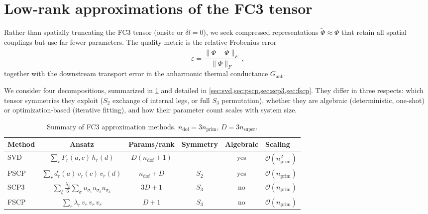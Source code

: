 \documentclass[11pt]{article}
\newcommand{\ndof}{n_{\mathrm{dof}}}
\newcommand{\nprim}{n_{\mathrm{prim}}}
\newcommand{\nsuper}{n_{\mathrm{super}}}
\newcommand{\cO}{\mathcal{O}}
\begin{document}
%
%

\section{Low-rank approximations of the FC3 tensor}
\label{sec:lowrank}

Rather than spatially truncating the FC3 tensor (onsite or
$\delta l = 0$), we seek compressed representations
$\tilde{\Phi} \approx \Phi$ that retain all spatial couplings but use
far fewer parameters.  The quality metric is the relative Frobenius
error
\begin{equation}\label{eq:error}
  \varepsilon = \frac{\|\Phi - \tilde\Phi\|_F}{\|\Phi\|_F}\,,
\end{equation}
together with the downstream transport error in the anharmonic thermal
conductance $G_\mathrm{anh}$.

We consider four decompositions, summarized in \cref{tab:methods} and
detailed in \cref{sec:svd,sec:pscp,sec:scp3,sec:fscp}.  They differ in
three respects: which tensor symmetries they exploit ($S_2$ exchange of
internal legs, or full $S_3$ permutation), whether they are algebraic
(deterministic, one-shot) or optimization-based (iterative fitting),
and how their parameter count scales with system size.

\begin{table}[ht]
\centering
\caption{Summary of FC3 approximation methods.
$\ndof = 3\nprim$, $D = 3\nsuper$.}
\label{tab:methods}
\begin{tabular}{@{}lccccl@{}}
\toprule
\textbf{Method}
  & \textbf{Ansatz}
  & \textbf{Params/rank}
  & \textbf{Symmetry}
  & \textbf{Algebraic}
  & \textbf{Scaling} \\
\midrule
SVD   & $\sum_r F_r(a,c)\,h_r(d)$
      & $D(\ndof + 1)$   & ---   & yes & $\cO(\nprim^2)$ \\
PSCP  & $\sum_r d_r(a)\,v_r(c)\,v_r(d)$
      & $\ndof + D$       & $S_2$ & yes & $\cO(\nprim)$   \\
SCP3  & $\sum_\xi \frac{\lambda_\xi}{6}\sum_{\sigma}
         u_{\sigma_1}u_{\sigma_2}u_{\sigma_3}$
      & $3D + 1$          & $S_3$ & no  & $\cO(\nprim)$   \\
FSCP  & $\sum_r \lambda_r\,v_r\,v_r\,v_r$
      & $D + 1$           & $S_3$ & no  & $\cO(\nprim)$   \\
\bottomrule
\end{tabular}
\end{table}
\end{document}
